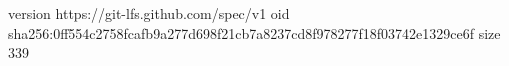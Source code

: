 version https://git-lfs.github.com/spec/v1
oid sha256:0ff554c2758fcafb9a277d698f21cb7a8237cd8f978277f18f03742e1329ce6f
size 339
